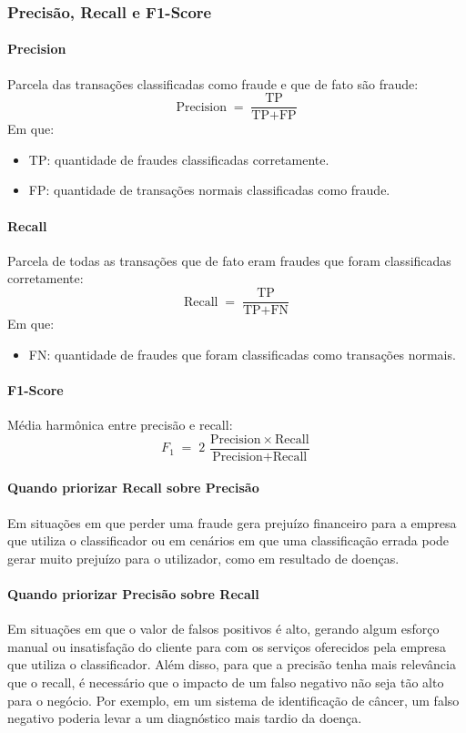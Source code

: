 \documentclass[conference]{IEEEtran}
\begin{document}
\subsubsection{Precisão, Recall e F1-Score}

\paragraph*{Precision}
    Parcela das transações classificadas como fraude e que de fato são fraude:
    \[
      \text{Precision} \;=\;
      \frac{\text{TP}}{\text{TP} + \text{FP}}
    \]
    Em que:
    \begin{itemize}
      \item TP: quantidade de fraudes classificadas corretamente.
      \item FP: quantidade de transações normais classificadas como fraude.
    \end{itemize}

  \paragraph*{Recall}
    Parcela de todas as transações que de fato eram fraudes que foram classificadas corretamente:
    \[
      \text{Recall} \;=\;
      \frac{\text{TP}}{\text{TP} + \text{FN}}
    \]
    Em que:
    \begin{itemize}
      \item FN: quantidade de fraudes que foram classificadas como transações normais.
    \end{itemize}

  \paragraph*{F1-Score}
    Média harmônica entre precisão e recall:
    \[
      F_1 \;=\;
      2 \,\frac{\text{Precision}\,\times\,\text{Recall}}
             {\text{Precision} + \text{Recall}}
    \]

\paragraph*{Quando priorizar Recall sobre Precisão}
  Em situações em que perder uma fraude gera prejuízo financeiro para a empresa que utiliza o classificador ou em cenários em que uma classificação errada pode gerar muito prejuízo para o utilizador, como em resultado de doenças.

\paragraph*{Quando priorizar Precisão sobre Recall}
  Em situações em que o valor de falsos positivos é alto, gerando algum esforço manual ou insatisfação do cliente para com os serviços oferecidos pela empresa que utiliza o classificador. Além disso, para que a precisão tenha mais relevância que o recall, é necessário que o impacto de um falso negativo não seja tão alto para o negócio. Por exemplo, em um sistema de identificação de câncer, um falso negativo poderia levar a um diagnóstico mais tardio da doença.\\
\end{document}
